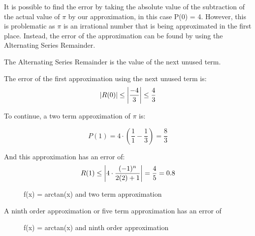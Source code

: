\documentclass[12pt, titlepage]{article}
\begin{document}
It is possible to find the error by taking the absolute value of  the subtraction of the actual value of \(\pi\) by our approximation, in this case P(0) = 4. However, this is problematic as \(\pi\) is an irrational number that is being approximated in the first place. Instead, the error of the approximation can be found by using the Alternating Series Remainder.

The Alternating Series Remainder is the value of the next unused term.

The error of the first approximation using the next unused term is:
\begin{equation}
  \abs{R(0)} \leq \abs{\frac{-4}{3}} \leq \frac{4}{3}
\end{equation}

To continue, a two term approximation of \(\pi\) is:

\begin{equation}
  P(1) = 4 \cdot (\frac{1}{1} - \frac{1}{3}) = \frac{8}{3} 
\end{equation}

And this approximation has an error of:
\begin{equation}
  R(1) \leq  \abs{4 \cdot {\frac{(-1)^n}{2(2)+1}}} = \frac{4}{5} = 0.8
\end{equation}

\begin{figure}[H]
\centering
    \caption[]{f(x) = arctan(x) and two term approximation}
\end{figure}

A ninth order approximation or five term approximation has an error of 
\begin{figure}[H]
\centering
    \caption[]{f(x) = arctan(x) and ninth order approximation}
\end{figure}
\end{document}
